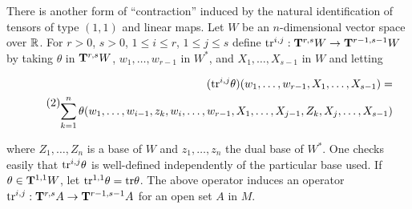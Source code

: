 \documentclass[../main]{sub+files}
\begin{document}
\par There is another form of ``contraction'' induced by the natural identification of tensors of type $(1, 1)$ and linear maps. Let $W$ be an $n$-dimensional vector space over $\bbR$. For $r > 0$, $s > 0$, $1 \le i \le r$, $1 \le j \le s$ define \newline $\tr^{i, j} : \tensorbundle{W}{r}{s} \functionMaps \tensorbundle{W}{r-1}{s-1}$ by taking $\theta$ in $\tensorbundle{W}{r}{s}$, $w_1, \ldots, w_{r - 1}$ in $W^\ast$, and $X_1, \ldots, X_{s - 1}$ in $W$ and letting 

\begin{equation}\tag{2}
\label{eqn:ch07.2}
\begin{split}
(\tr^{i, j} \theta)(w_1, \ldots, w_{r - 1}, X_1, \ldots, X_{s - 1}) = \\ 
\sum_{k = 1}^n \theta(w_1, \ldots, w_{i - 1}, z_k, w_i, \ldots, w_{r - 1}, X_1, \ldots, X_{j - 1}, Z_k, X_j, \ldots, X_{s-1})
\end{split}
\end{equation}

where $Z_1, \ldots, Z_n$ is a base of $W$ and $z_1, \ldots, z_n$ the dual base of $W^\ast$. One checks easily that $\tr^{i, j} \theta$ is well-defined independently of the particular base used. If $\theta \in \tensorbundle{W}{1}{1}$, let $\tr^{1, 1}\theta = \tr \theta$. The above operator induces an operator \newline $\tr^{i, j} : \tensorbundle{A}{r}{s} \functionMaps \tensorbundle{A}{r-1}{s-1}$ for an open set $A$ in $M$. 
\end{document}
